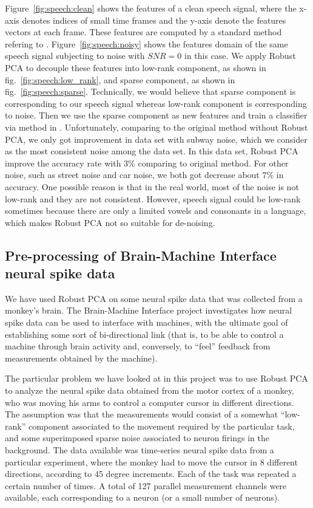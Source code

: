 \documentclass{../../common/projectreport}
\begin{document}
Figure~\ref{fig:speech:clean} shows the features of a clean speech signal, where the x-axis denotes indices of small time frames and the y-axis denote the features vectors at each frame. These features are computed by a standard method refering to \cite{}. Figure~\ref{fig:speech:noisy} shows the features domain of the same speech signal subjecting to noise with $SNR = 0$ in this case. We apply Robust PCA to decouple these features into low-rank component, as shown in fig.~\ref{fig:speech:low_rank}, and sparse component, as shown in fig.~\ref{fig:speech:sparse}. Technically, we would believe that sparse component is corresponding to our speech signal whereas low-rank component is corresponding to noise. Then we use the sparse component as new features and train a classifier via method in \cite{}. Unfortunately, comparing to the original method without  Robust PCA, we only got improvement in data set with subway noise, which we consider as the most consistent noise among the data set. In this data set, Robust PCA improve the accuracy rate with 3\% comparing to original method. For other noise, such as street noise and car noise, we both got decrease about 7\% in accuracy. One possible reason is that in the real world, most of the noise is not low-rank and they are not consistent. However, speech signal could be low-rank sometimes because there are only a limited vowels and consonants in a language, which makes Robust PCA not so suitable for de-noising.  



\subsection{Pre-processing of Brain-Machine Interface neural spike data}

We have used Robust PCA on some neural spike data that was collected from a monkey's brain. The Brain-Machine Interface project investigates how neural spike data can be used to interface with machines, with the ultimate goal of establishing some sort of bi-directional link (that is, to be able to control a machine through brain activity and, conversely, to ``feel'' feedback from measurements obtained by the machine). 

The particular problem we have looked at in this project was to use Robust PCA to analyze the neural spike data obtained from the motor cortex of a monkey, who was moving his arms to control a computer cursor in different directions. The assumption was that the measurements would consist of a somewhat ``low-rank'' component associated to the movement required by the particular task, and some superimposed sparse noise associated to neuron firings in the background. The data available was time-series neural spike data from a particular experiment, where the monkey had to move the cursor in 8 different directions, according to 45 degree increments. Each of the task was repeated a certain number of times. A total of 127 parallel measurement channels were available, each corresponding to a neuron (or a small number of neurons). 
\end{document}
